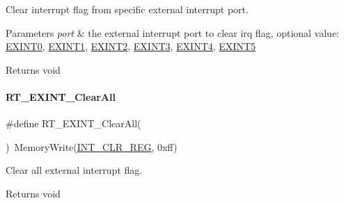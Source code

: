 Clear interrupt flag from specific external interrupt port. 


\begin{DoxyParams}{Parameters}
{\em port} & the external interrupt port to clear irq flag, optional value\+: \mbox{\hyperlink{a00011_a2e3f727d359d26314631842394f4a223}{E\+X\+I\+N\+T0}}, \mbox{\hyperlink{a00011_a1ea7d6796165b98f1bc6bf6fe841c3d9}{E\+X\+I\+N\+T1}}, \mbox{\hyperlink{a00011_ac959f4d8aed4e04e25c966e6c8315431}{E\+X\+I\+N\+T2}}, \mbox{\hyperlink{a00011_ae8428c0cbd7362b90ea048bcf59aef2c}{E\+X\+I\+N\+T3}}, \mbox{\hyperlink{a00011_a719b5fa27b5469e1fe2844e9930fa249}{E\+X\+I\+N\+T4}}, \mbox{\hyperlink{a00011_a309fb21107f9f6261cd7e7ca9de6c2f2}{E\+X\+I\+N\+T5}} \\
\hline
\end{DoxyParams}
\begin{DoxyReturn}{Returns}
void 
\end{DoxyReturn}
\mbox{\label{a00011_a4f2cc857d9a0da5f06bbf5ff62babbdb}} 
\paragraph{\texorpdfstring{R\+T\+\_\+\+E\+X\+I\+N\+T\+\_\+\+Clear\+All}{RT\_EXINT\_ClearAll}}
{\footnotesize\ttfamily \#define R\+T\+\_\+\+E\+X\+I\+N\+T\+\_\+\+Clear\+All(\begin{DoxyParamCaption}{ }\end{DoxyParamCaption})~Memory\+Write(\mbox{\hyperlink{a00020_adadaa0ab1ebbd7ba9b70dfd24c3ed44da33cabaff7369092ec0e29dd2ffb0cb3d}{I\+N\+T\+\_\+\+C\+L\+R\+\_\+\+R\+EG}}, 0xff)}



Clear all external interrupt flag. 

\begin{DoxyReturn}{Returns}
void 
\end{DoxyReturn}
\mbox{\label{a00011_ab8287fc872a2d0ae785c8b3b51a37a5e}} 
